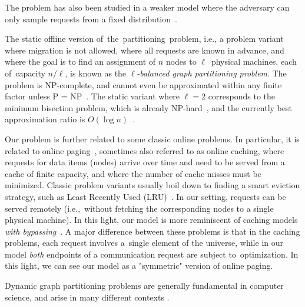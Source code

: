 \documentclass[a4paper,anonymous,USenglish]{lipics-v2019}
\begin{document}
The problem has also been studied in a weaker
model where the adversary can only sample
requests from a fixed distribution~\cite{stochastic-ring}.

The static offline version of~the~partitioning~problem, i.e., a problem variant where
migration is not allowed, where all requests are known in advance, and where
the goal is to find an assignment of $n$ nodes to $\ell$~physical machines, each of~capacity $n/\ell$, is known as the
\emph{$\ell$-balanced graph partitioning problem}. The problem is 
NP-complete, and cannot even be approximated within any finite factor unless P
= NP~\cite{AndRae06}.  The static
variant where $\ell = 2$ corresponds to the minimum bisection problem, which
is already NP-hard~\cite{GaJoSt76}, and 
the currently best approximation ratio is $O(\log n)$~\cite{SarVaz95,ArKaKa99,FeKrNi00,FeiKra02,KraFei06,Raec08}.

Our problem is further related to some classic online problems.
In particular, it is related to online paging~\cite{SleTar85,FKLMSY91,McGSle91,AcChNo00}, sometimes also referred to
as online caching, where requests for data items (nodes) arrive over time and
need to be served from a cache of finite capacity, and where the number of
cache misses must be minimized. Classic problem variants usually boil down to
finding a smart eviction strategy, such as Least Recently Used (LRU)~\cite{SleTar85}. In our
setting, requests can be served remotely (i.e.,~without fetching the
corresponding nodes to a single physical machine). In this light, our model is more
reminiscent of caching models \emph{with
bypassing}~\cite{EpImLN11,EpImLN15,Irani02}.
A major difference between  these problems is that in the caching problems, each request involves a~single element of the universe, while in our model \emph{both} endpoints of a communication request are subject to~optimization.
In this light, we can see our model as a "symmetric" version of online paging.

Dynamic graph partitioning problems are generally fundamental in computer science, and arise in many different contexts \cite{streaming-soda,streaming1}.

\end{document}
